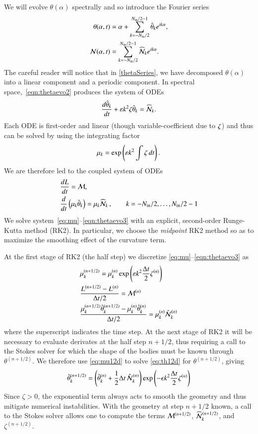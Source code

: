 \documentclass[preprint, 10pt]{elsarticle}
\begin{document}
We will evolve $\theta(\alpha)$ spectrally and so introduce the Fourier series
\begin{align}
\label{thetaSeries}
 \theta(\alpha,t) &= \alpha + \FourierSum \thhat_k e^{ i k \alpha}, \\
 \NLterm(\alpha,t)  &= \FourierSum \widehat{\NLterm}_k e^{ i k \alpha}.
\end{align}
The careful reader will notice that in \eqref{thetaSeries}, we have decomposed $\theta(\alpha)$ into a linear component and a periodic component.
In spectral space,~\eqref{eqn:thetaevo2} produces the system of ODEs
\begin{align*}
\tderiv{\thhat_k}{t} +  \eps k^2  \elfun \thhat_k = \widehat{\NLterm}_k.
\end{align*}
Each ODE is first-order and linear (though variable-coefficient due to
$\zeta$) and thus can be solved by using the integrating factor
\begin{align}
\label{eq:mu}
\mu_k = \exp \left( \varepsilon k^2 \int \zeta \, dt \right).
\end{align}
We are therefore led to the coupled system of ODEs
\begin{align}
\label{eqn:Levo3}
& \tderiv{L}{t} = \Mterm, \\
\label{eqn:thetaevo3}
& \tderiv{}{t}\left( \mu_k \thhat_k \right) = \mu_k \widehat{\NLterm}_k \, ,
\qquad k = -N_\iin/2, \ldots, N_\iin/2 -1
\end{align}
We solve system~\eqref{eq:mu}--\eqref{eqn:thetaevo3} with an
explicit, second-order Runge-Kutta method (RK2). In particular, we choose the {\em midpoint} RK2 method so as to maximize the smoothing effect of the curvature term.

At the first stage of RK2 (the half step) we discretize \eqref{eq:mu}--\eqref{eqn:thetaevo3} as
\begin{align}
\label{eq:mu12d}
& \mu_k^{(n+1/2)} = \mu_k^{(n)} \exp \left( \varepsilon k^2 \frac{\Delta t}{2} \zeta^{(n)} \right) \\
\label{eq:L12d}
& \frac{L^{(n+1/2)} - L^{(n)}}{\Delta t/2} = \mathcal{M}^{(n)} \\
\label{eq:th12d}
& \frac{ \mu_k^{(n+1/2)} \hat{\theta}_k^{(n+1/2)} - \mu_k^{(n)} \hat{\theta}_k^{(n)}}{\Delta t/2} 
= \mu_k^{(n)} \hat{\mathcal{N}}_k^{(n)}
\end{align}
where the superscript indicates the time step. At the next stage of RK2 it will be necessary to evaluate derivates at the half step $n+1/2$, thus requiring a call to the Stokes solver for which the shape of the bodies must be known through $\theta^{(n+1/2)}$. We therefore use \eqref{eq:mu12d} to solve \eqref{eq:th12d} for $\theta^{(n+1/2)}$, giving
\begin{align}
\label{eq:th12}
\hat{\theta}_k^{(n+1/2)} = \left( \hat{\theta}_k^{(n)} + \frac{1}{2} \Delta t \, \hat{\mathcal{N}}_k^{(n)} \right)
\exp \left( -\epsilon k^2 \frac{\Delta t}{2} \zeta^{(n)}\right)
\end{align}
Since $\zeta >0$, the exponential term always acts to smooth the geometry and thus mitigate numerical instabilities. With the geometry at step $n+1/2$ known, a call to the Stokes solver allows one to compute the terms $\mathcal{M}^{(n+1/2)}$, $\widehat{\NLterm}_k^{(n+1/2)}$, and $\zeta^{(n+1/2)}$.
\end{document}
